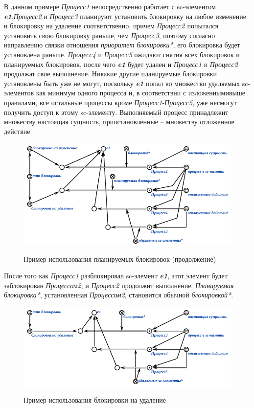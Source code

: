 В данном примере \textit{Процесс1} непосредственно работает с sc-элементом \textit{\textbf{e1}},\textit{Процесс2} и \textit{Процесс3} планируют установить блокировку на любое изменение и блокировку на удаление соответственно, причем \textit{Процесс2} попытался установить свою блокировку раньше, чем \textit{Процесс3}, поэтому согласно направлению связки отношения \textit{приоритет блокировки*}, его блокировка будет установлена раньше. \textit{Процесс4} и \textit{Процесс5} ожидают снятия всех блокировок и планируемых блокировок, после чего \textit{\textbf{e1}} будет удален и \textit{Процесс1} и \textit{Процесс2} продолжат свое выполнение. Никакие другие планируемые блокировки установлены быть уже не могут, поскольку \textit{\textbf{e1}} попал во множество удаляемых sc-элементов как минимум одного процесса и, в соответствии с изложеннымивыше правилами, все остальные процессы кроме \textit{Процесс1}-\textit{Процесс5}, уже несмогут получить доступ к этому sc-элементу.		
Выполняемый процесс принадлежит множеству настоящая сущность, приостановленные -- множеству отложенное действие.

\begin{figure}[H]
	\centering
	\caption{Пример использования планируемых блокировок (продолжение)}
	\includegraphics[scale=0.8]{images/part3/chapter_situation_management/plan_lock_2.png}
	\label{fig:plan_lock_2}
\end{figure}

После того как \textit{Процесс1} разблокировал sc-элемент \textit{\textbf{e1}}, этот элемент будет заблокирован \textit{Процессом2}, и \textit{Процесс2} продолжит выполнение. \textit{Планируемая блокировка*}, установленная \textit{Процессом2}, становится обычной \textit{блокировкой*}.

\begin{figure}[H]
	\centering
	\caption{Пример использования блокировки на удаление}
	\includegraphics[scale=0.8]{images/part3/chapter_situation_management/plan_lock_3.png}
	\label{fig:plan_lock_3}
\end{figure}

